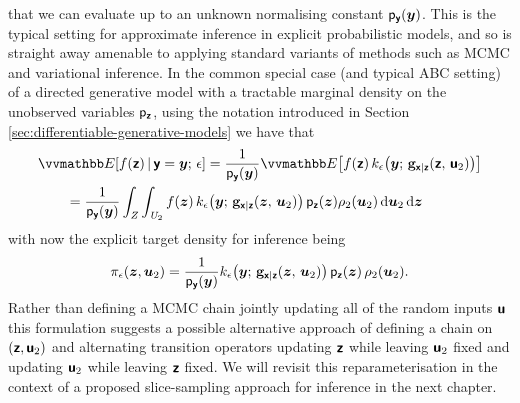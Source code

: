 that we can evaluate up to an unknown normalising constant $\mathsf{p}_{\boldsymbol{\mathsf{y}}}(\boldsymbol{y})$. This is the typical setting for approximate inference in explicit probabilistic models, and so is straight away amenable to applying standard variants of methods such as \ac{MCMC} and variational inference. In the common special case (and typical \ac{ABC} setting) of a directed generative model with a tractable marginal density on the unobserved variables $\mathsf{p}_{\boldsymbol{\mathsf{z}}}$, using the notation introduced in Section \eqref{sec:differentiable-generative-models} we have that
\begin{align}\label{eq:abc-expectation-input-space-directed}
  &\expc{f(\rvct{z}) \gvn \rvct{y}=\vct{y};\,\epsilon} =
  \frac{1}{\pden{\rvct{y}}(\vct{y})} 
  \expc{f(\rvct{z}) \, k_\epsilon\lpa\vct{y};\,\genfunc_{\rvct{x}|\rvct{z}}(\rvct{z},\,\rvct{u}_2)\rpa}
  \\
  &\qquad=
  \frac{1}{\pden{\rvct{y}}(\vct{y})}
  \int_\set{Z}\int_{\set{U}_2} 
    f(\vct{z}) \,
    k_\epsilon{\lpa\vct{y};\,\genfunc_{\rvct{x}|\rvct{z}}(\vct{z},\,\vct{u}_2)\rpa}\,
    \pden{\rvct{z}}(\vct{z})
    \rho_2(\vct{u}_2)
  \,\dr\vct{u}_2\,\dr\vct{z}
\end{align}
with now the explicit target density for inference being
\begin{equation}\label{eq:abc-density-input-space-directed}
  \pi_\epsilon(\vct{z},\vct{u}_2) = \frac{1}{\pden{\rvct{y}}(\vct{y})} 
  k_\epsilon{\lpa\vct{y};\,\genfunc_{\rvct{x}|\rvct{z}}(\vct{z},\,\vct{u}_2)\rpa}\,\pden{\rvct{z}}(\vct{z})\,\rho_2(\vct{u}_2).
\end{equation}
Rather than defining a \ac{MCMC} chain jointly updating all of the random inputs $\boldsymbol{\mathsf{u}}$ this formulation suggests a possible alternative approach of defining a chain on $(\boldsymbol{\mathsf{z}},\boldsymbol{\mathsf{u}}_2)$ and alternating transition operators updating $\boldsymbol{\mathsf{z}}$ while leaving $\boldsymbol{\mathsf{u}}_2$ fixed and updating $\boldsymbol{\mathsf{u}}_2$ while leaving $\boldsymbol{\mathsf{z}}$ fixed. We will revisit this reparameterisation in the context of a proposed slice-sampling approach for inference in the next chapter.

